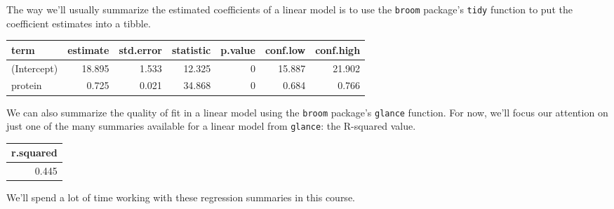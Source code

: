 \documentclass[
]{book}
\newenvironment{Shaded}{\begin{snugshade}}{\end{snugshade}}
\newcommand{\DataTypeTok}[1]{\textcolor[rgb]{0.13,0.29,0.53}{#1}}
\newcommand{\DecValTok}[1]{\textcolor[rgb]{0.00,0.00,0.81}{#1}}
\newcommand{\FloatTok}[1]{\textcolor[rgb]{0.00,0.00,0.81}{#1}}
\newcommand{\KeywordTok}[1]{\textcolor[rgb]{0.13,0.29,0.53}{\textbf{#1}}}
\newcommand{\NormalTok}[1]{#1}
\newcommand{\OperatorTok}[1]{\textcolor[rgb]{0.81,0.36,0.00}{\textbf{#1}}}
\newcommand{\OtherTok}[1]{\textcolor[rgb]{0.56,0.35,0.01}{#1}}
\newcommand{\StringTok}[1]{\textcolor[rgb]{0.31,0.60,0.02}{#1}}
\begin{document}
The way we'll usually summarize the estimated coefficients of a linear model is to use the \texttt{broom} package's \texttt{tidy} function to put the coefficient estimates into a tibble.

\begin{Shaded}
\end{Shaded}

\begin{tabular}{l|r|r|r|r|r|r}
\hline
term & estimate & std.error & statistic & p.value & conf.low & conf.high\\
\hline
(Intercept) & 18.895 & 1.533 & 12.325 & 0 & 15.887 & 21.902\\
\hline
protein & 0.725 & 0.021 & 34.868 & 0 & 0.684 & 0.766\\
\hline
\end{tabular}

We can also summarize the quality of fit in a linear model using the \texttt{broom} package's \texttt{glance} function. For now, we'll focus our attention on just one of the many summaries available for a linear model from \texttt{glance}: the R-squared value.

\begin{Shaded}
\end{Shaded}

\begin{tabular}{r}
\hline
r.squared\\
\hline
0.445\\
\hline
\end{tabular}

We'll spend a lot of time working with these regression summaries in this course.
\end{document}
